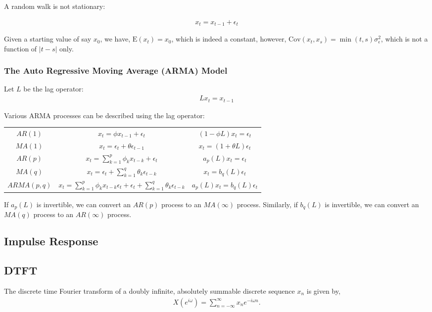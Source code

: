 \documentclass{amsart}
\theoremstyle{plain}
\numberwithin{equation}{section}
\begin{document}
A random walk is not stationary:

\begin{align*}
x_t = x_{t-1} + \epsilon_t
\end{align*}

Given a starting value of 
say $x_0$, we have, $\mathrm{E}(x_t) = x_0$, which is indeed a constant, however,
$\mathrm{Cov}(x_t, x_s) = \min(t, s) \sigma_{\epsilon}^2$, which is not 
a function of $|t-s|$ only.
 
\subsubsection*{The Auto Regressive Moving Average (ARMA) Model}

Let $L$ be the lag operator:
\begin{align*}
Lx_t = x_{t-1} 
\end{align*} 

Various ARMA processes can be described using
the lag operator:

\begin{center}
\begin{tabular}{|c|c|c|}
$AR(1)$ & $x_t = \phi x_{t-1} + \epsilon_t$ & $(1-\phi L) x_t = \epsilon_t$\\
$MA(1)$ & $x_t = \epsilon_t + \theta \epsilon_{t-1}$ & $x_t = (1+\theta L)\epsilon_t$\\
$AR(p)$ & $x_t = \sum_{k=1}^{p}\phi_k x_{t-k} + \epsilon_t$ & $a_p(L) x_t = \epsilon_t$\\
$MA(q)$ & $x_t = \epsilon_t + \sum_{k=1}^{q}\theta_{k} \epsilon_{t-k}$ & $x_t = b_q(L)\epsilon_t$\\
$ARMA(p, q)$ &$x_t = \sum_{k=1}^{p}\phi_k x_{t-k} \epsilon_t
+ \epsilon_t + \sum_{k=1}^{q}\theta_{k} \epsilon_{t-k}$
& $a_p(L)x_t = b_q(L)\epsilon_t$\\
\end{tabular}
\end{center}

If $a_p(L)$ is invertible, we can convert an $AR(p)$ process
to an $MA(\infty)$ process. Similarly, if $b_q(L)$ is 
invertible, we can convert an $MA(q)$ process to an 
$AR(\infty)$ process. 


\subsection{Impulse Response}
 
\subsection{DTFT}
The discrete time Fourier transform of 
a doubly infinite, absolutely summable discrete sequence $x_n$
is given by,
\begin{align*}
X(e^{i\omega}) = \sum_{n=-\infty}^{\infty} x_n e^{-i \omega n}.
\end{align*}
\end{document}
